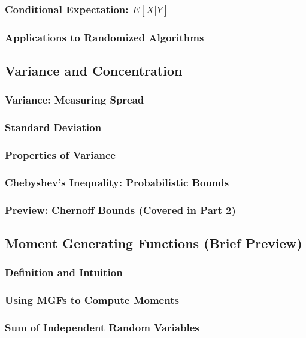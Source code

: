 \subsubsection{Conditional Expectation: $E[X | Y]$}
\subsubsection{Applications to Randomized Algorithms}

\subsection{Variance and Concentration}
\label{subsec:variance}

\subsubsection{Variance: Measuring Spread}
\subsubsection{Standard Deviation}
\subsubsection{Properties of Variance}
\subsubsection{Chebyshev's Inequality: Probabilistic Bounds}
\subsubsection{Preview: Chernoff Bounds (Covered in Part 2)}

\subsection{Moment Generating Functions (Brief Preview)}
\label{subsec:mgf}

\subsubsection{Definition and Intuition}
\subsubsection{Using MGFs to Compute Moments}
\subsubsection{Sum of Independent Random Variables}


